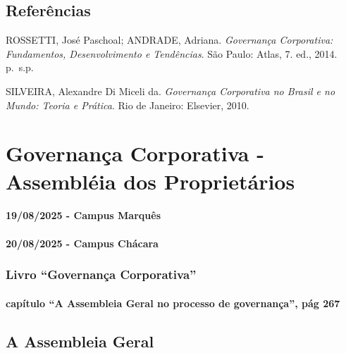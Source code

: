 \documentclass[
]{book}
\begin{document}
\section{Referências}\label{referuxeancias}

ROSSETTI, José Paschoal; ANDRADE, Adriana. \emph{Governança Corporativa: Fundamentos, Desenvolvimento e Tendências}. São Paulo: Atlas, 7. ed., 2014. p.~s.p.

SILVEIRA, Alexandre Di Miceli da. \emph{Governança Corporativa no Brasil e no Mundo: Teoria e Prática}. Rio de Janeiro: Elsevier, 2010.

\chapter{Governança Corporativa - Assembléia dos Proprietários}\label{governanuxe7a-corporativa---assembluxe9ia-dos-proprietuxe1rios}

\subsubsection*{19/08/2025 - Campus Marquês}\label{campus-marquuxeas-2}

\subsubsection*{20/08/2025 - Campus Chácara}\label{campus-chuxe1cara-2}

\subsection{Livro ``Governança Corporativa''}\label{livro-governanuxe7a-corporativa}

\subsubsection{capítulo ``A Assembleia Geral no processo de governança'', pág 267}\label{capuxedtulo-a-assembleia-geral-no-processo-de-governanuxe7a-puxe1g-267}

\section{\texorpdfstring{\textbf{A Assembleia Geral}}{A Assembleia Geral}}\label{a-assembleia-geral}
\end{document}
